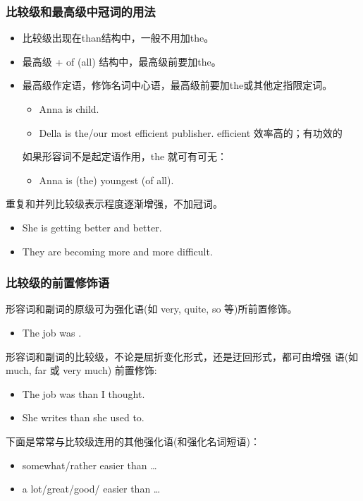 \subsubsection{比较级和最高级中冠词的用法}

\begin{itemize}
\item 比较级出现在than结构中，一般不用加the。


\item 最高级 + of (all) 结构中，最高级前要加the。

\item 最高级作定语，修饰名词中心语，最高级前要加the或其他定指限定词。
  \begin{itemize}
  \item Anna is  child.

  \item Della is the/our most efficient publisher. \quad efficient
     效率高的；有功效的
  \end{itemize}

  如果形容词不是起定语作用，the 就可有可无：
  \begin{itemize}
  \item Anna is (the) youngest (of all).
  \end{itemize}
\end{itemize}

重复和并列比较级表示程度逐渐增强，不加冠词。
\begin{itemize}
\item She is getting better and better.

\item They are becoming more and more difficult.
\end{itemize}


\subsubsection{比较级的前置修饰语}

形容词和副词的原级可为强化语(如 very, quite, so 等)所前置修饰。
\begin{itemize}
\item The job was .
\end{itemize}

形容词和副词的比较级，不论是屈折变化形式，还是迂回形式，都可由增强
语(如 much, far 或 very much) 前置修饰:
\begin{itemize}
\item The job was  than I thought.
\item She writes  than she used to.
\end{itemize}

下面是常常与比较级连用的其他强化语(和强化名词短语)：
\begin{itemize}
\item somewhat/rather easier than \ldots{}
\item a lot/great/good/ easier than \ldots{}
\end{itemize}




